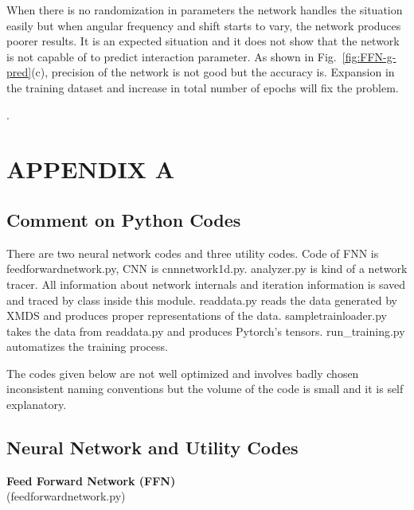\documentclass[a4paper,times,12pt]{article}
\begin{document}
When there is no randomization in parameters the network handles the situation easily but when angular frequency and shift starts to vary, the network produces poorer results. It is an expected situation and it does not show that the network is not capable of to predict interaction parameter. As shown in Fig.~\ref{fig:FFN-g-pred}(c), precision of the network is not good but the accuracy is. Expansion in the training dataset and increase in total number of epochs will fix the problem.

\cite{barenghi2016primer}.
\cite{nielsen2015neural}
\cite{mills2017deep}
\cite{goodfellow2016deep}
\cite{dennis2013xmds2}
\cite{muruganandam2009fortran}
\cite{zimmermann2011comparison}
\cite{paszke2017automatic}





\appendix
\section{APPENDIX A}

\subsection{Comment on Python Codes}

There are two neural network codes and three utility codes. Code of FNN is feedforwardnetwork.py, CNN is cnnnetwork1d.py. analyzer.py is kind of a network tracer. All information about network internals and iteration information is saved and traced by class inside this module. readdata.py reads the data generated by XMDS and produces proper representations of the data. sampletrainloader.py takes the data from readdata.py and produces Pytorch's tensors. run\_training.py automatizes the training process. 


The codes given below are not well optimized and involves badly chosen inconsistent naming conventions but the volume of the code is small and it is self explanatory. 

\subsection{Neural Network and Utility Codes}

\textbf{Feed Forward Network (FFN)}\\
(feedforwardnetwork.py)
\inputminted[breaklines]{python}{../Src/feedforwardnetwork.py}
\end{document}
